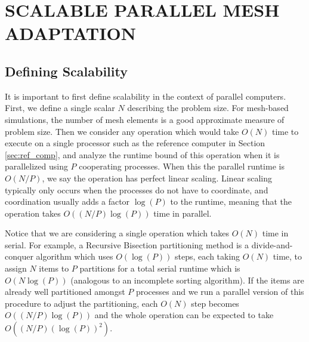 
\chapter{SCALABLE PARALLEL MESH ADAPTATION}
\label{chap:parallel}

\section{Defining Scalability}
\label{sec:scalable}

It is important to first define scalability in the context of
parallel computers.
First, we define a single scalar $N$ describing the problem size.
For mesh-based simulations, the number of mesh elements
is a good approximate measure of problem size.
Then we consider any operation which would take $O(N)$ time to execute
on a single processor such as the reference computer
in Section \ref{sec:ref_comp}, and analyze the runtime bound
of this operation when it is parallelized using $P$ cooperating processes.
When this the parallel runtime is $O(N/P)$, we say the operation
has perfect linear scaling.
Linear scaling typically only occurs when the processes do not have to coordinate,
and coordination usually adds a factor $\log(P)$ to the runtime,
meaning that the operation takes $O((N/P)\log(P))$ time in parallel.

Notice that we are considering a single operation which takes $O(N)$
time in serial.
For example, a Recursive Bisection partitioning method is a
divide-and-conquer algorithm which uses $O(\log(P))$ steps, each
taking $O(N)$ time, to assign $N$ items to $P$ partitions
for a total serial runtime which is $O(N\log(P))$
(analogous to an incomplete sorting algorithm).
If the items are already well partitioned amongst $P$ processes
and we run a parallel version of this procedure to adjust the
partitioning, each $O(N)$ step becomes $O((N/P)\log(P))$
and the whole operation can be expected to take $O((N/P)(\log(P))^2)$.

